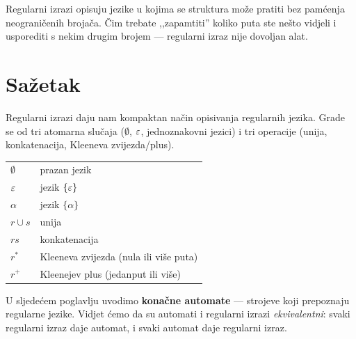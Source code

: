 \begin{kljucno}
Regularni izrazi opisuju jezike u kojima se struktura može pratiti bez
pamćenja neograničenih brojača. Čim trebate ,,zapamtiti'' koliko puta
ste nešto vidjeli i usporediti s nekim drugim brojem --- regularni izraz
nije dovoljan alat.
\end{kljucno}

\section*{Sažetak}

Regularni izrazi daju nam kompaktan način opisivanja regularnih jezika.
Grade se od tri atomarna slučaja ($\emptyset$, $\varepsilon$, jednoznakovni jezici)
i tri operacije (unija, konkatenacija, Kleeneva zvijezda/plus).

\medskip
\noindent
\begin{tabular}{ll}
  $\emptyset$  & prazan jezik \\
  $\varepsilon$       & jezik $\{\varepsilon\}$ \\
  $\alpha$     & jezik $\{\alpha\}$ \\
  $r \cup s$   & unija \\
  $rs$         & konkatenacija \\
  $r^*$        & Kleeneva zvijezda (nula ili više puta) \\
  $r^+$        & Kleenejev plus (jedanput ili više) \\
\end{tabular}

\medskip
\noindent U sljedećem poglavlju uvodimo \textbf{konačne automate} ---
strojeve koji prepoznaju regularne jezike. Vidjet ćemo da su automati i
regularni izrazi \emph{ekvivalentni}: svaki regularni izraz daje automat,
i svaki automat daje regularni izraz.

